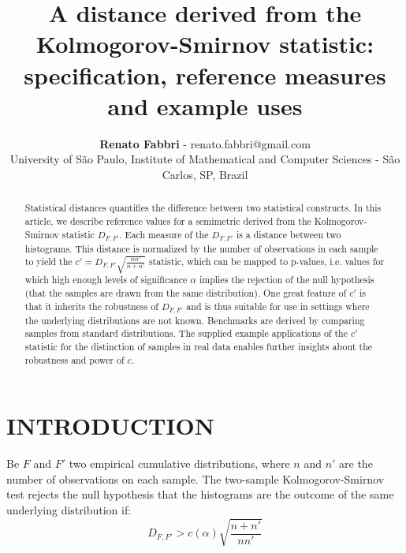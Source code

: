 \documentclass[12pt,fleqn]{article}
\title{A distance derived from the Kolmogorov-Smirnov statistic:
	specification, reference measures and example uses}
\author
    {\rm \begin{tabular}{l} 
    \textbf{Renato Fabbri}$$ - {\textnormal renato.fabbri@gmail.com}\\%
    {\fontsize{11}{0}\selectfont University of São Paulo, Institute of Mathematical and Computer Sciences - São Carlos, SP, Brazil}\vspace*{-0.05cm} \\
  \end{tabular}}
\renewcommand{\headrulewidth}{0.0pt}
\begin{document}
\maketitle

\thispagestyle{firspagetstyle}

\renewcommand{\headrulewidth}{0.0pt}
\rhead{}

\begin{abstract}
Statistical distances quantifies the difference between two statistical constructs.
In this article, we describe reference values for a semimetric
derived from the Kolmogorov-Smirnov statistic $D_{F,F'}$.
Each measure of the $D_{F,F'}$ is a distance between two histograms.
This distance is normalized by the number of observations in each sample
to yield the $c'=D_{F,F'}\sqrt{\frac{n n'}{n+n'}}$ statistic,
which can be mapped to p-values, i.e. values for which 
high enough levels of significance $\alpha$ implies the rejection of the
	null hypothesis (that the samples are drawn from the same distribution).
One great feature of $c'$ is that it inherits the robustness of
	$D_{F,F'}$ and is thus suitable for use in settings where
	the underlying distributions are not known.
Benchmarks are derived by comparing samples from standard distributions.
The supplied example applications of the $c'$ statistic for the distinction
	of samples in real data enables further
insights about the robustness and power of $c$.
\end{abstract}


\pagestyle{fancy}

\section{INTRODUCTION}\label{sec:intro}
Be $F$ and $F'$ two empirical cumulative distributions,
where $n$ and $n'$ are the number of observations on each sample.
The two-sample Kolmogorov-Smirnov test rejects the null hypothesis
that the histograms are the outcome of the same underlying distribution
if:
\begin{equation}\label{eq:ks}
D_{F,F'} > c(\alpha)\sqrt{\frac{n+n'}{nn'}}
\end{equation}
\end{document}
